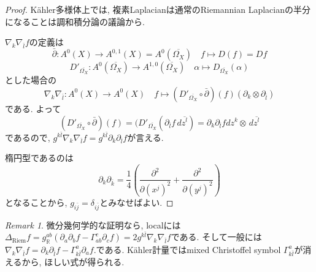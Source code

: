 \documentclass[dvipdfmx,a4paper,11pt]{article} %
\theoremstyle{definition}
\theoremstyle{remark}
\newtheorem{rem}[thm]{Remark}
\numberwithin{equation}{section}
\newcommand{\R}{\mathbb{R}}
\begin{document}
\begin{proof}
K\"ahler多様体上では, 複素Laplacianは通常のRiemannian Laplacianの半分になることは調和積分論の議論から. 

$\nabla_k\nabla_{\bar l}f$の定義は
\[
\bar\partial \colon A^0(X) \to A^{0,1}(X)=A^{0}(\overline{\Omega_X})
\quad
f \mapsto D(f)=Df
\]
\[
D'_{\overline{\Omega_X}} \colon A^{0}(\overline{\Omega_X}) \to A^{1,0}(\overline{\Omega_X})
\quad
\alpha \mapsto D_{\overline{\Omega_X}}(\alpha)
\]
とした場合の
\[
\nabla_k\nabla_{\bar l}\colon
 A^{0}(X) \to A^{0}(X)
 \quad
 f \mapsto (D'_{\overline{\Omega_X}}\circ \bar\partial)(f)(\partial_k \otimes \partial_{\bar l})
\]
である. 
よって
\[
(D'_{\overline{\Omega_X}}\circ \bar\partial)(f)
=(D'_{\overline{\Omega_X}} (\partial_{\bar l}f\,d\overline{z^l})
=\partial_k \partial_{\bar l}f dz^k \otimes\,d\overline{z^l}
\]
であるので, $g^{k\bar l}\nabla_k\nabla_{\bar l}f = g^{k\bar l}\partial_k\partial_{\bar l}f$が言える. 

楕円型であるのは
\[
\partial_k \partial_{\bar k}
=
\frac{1}{4}\left(\frac{\partial^2}{\partial (x^j)^2} +  \frac{\partial^2}{\partial (y^j)^2} \right)
\]
となることから, $g_{i \bar{j}}=\delta_{i\bar{j}}$とみなせばよい.
\end{proof}

\begin{rem}
微分幾何学的な証明なら, 
localには
$
\Delta_{\mathrm{Riem}} f
=
g^{ab}_{\R}(\partial_a \partial_b f -\Gamma_{ab}^c \partial_c f)
=2g^{k\bar l}\nabla_k\nabla_{\bar l}f
$である. そして一般には
\(
\nabla_k\nabla_{\bar l}f
=
\partial_k\partial_{\bar l}f
-
\Gamma^{a}_{k\bar l}\partial_af.
\)である. K\"ahler計量ではmixed Christoffel symbol $\Gamma^{a}_{k\bar l}$が消えるから, ほしい式が得られる. 
\end{rem}
\end{document}
